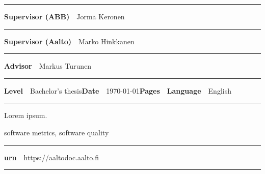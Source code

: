 \begin{spacing}{.88}
{\vspace{-2.4mm}\rule{\textwidth}{.75pt}

{\fontsize{10.5pt}{10.5pt}\bfseries\sffamily\lsstyle Supervisor (ABB)}~~{\small Jorma Keronen}

\vspace{-2.4mm}\rule{\textwidth}{.75pt}

{\fontsize{10.5pt}{10.5pt}\bfseries\sffamily\lsstyle Supervisor (Aalto)}~~{\small Marko Hinkkanen}

\vspace{-2.4mm}\rule{\textwidth}{.75pt}

{\fontsize{10.5pt}{10.5pt}\bfseries\sffamily\lsstyle Advisor}~~{\small Markus Turunen}

\vspace{-2.4mm}\rule{\textwidth}{.75pt}

{\fontsize{10.5pt}{10.5pt}\bfseries\sffamily\lsstyle Level}~~{\small Bachelor's thesis}\hfill{\fontsize{10.5pt}{10.5pt}\bfseries\sffamily\lsstyle Date}~~{\small \today}\hfill{\fontsize{10.5pt}{10.5pt}\bfseries\sffamily\lsstyle Pages}~~{\small \pageref{LastPage}}\hfill{\fontsize{10.5pt}{10.5pt}\bfseries\sffamily\lsstyle Language}~~{\small English}

\vspace{-2.4mm}\rule{\textwidth}{.75pt}

\vspace{6mm}

} %
\end{spacing}
\begin{spacing}{1.05}

\vspace{.8mm}

{\small
  Lorem ipsum.
}

\vfill

\end{spacing}
\begin{spacing}{.88}
{\parindent0pt %

\parbox[t]{123.6mm}{\raggedright\small software metrics, software quality}

\vspace{.5mm}\rule{\textwidth}{.75pt}

{\fontsize{10.5pt}{10.5pt}\bfseries\sffamily\lsstyle urn}~~{\small https://aaltodoc.aalto.fi}

\vspace{-2.4mm}\rule{\textwidth}{.75pt}

} %
\end{spacing}



